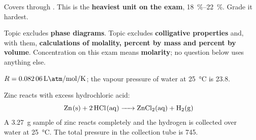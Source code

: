 \documentclass{apchem-exam}
\begin{document}
\apctitleblock

\begin{apcnote}
Covers  through . This is the \textbf{heaviest unit on
the exam}, \SI{18}{\percent}--\SI{22}{\percent}. Grade it hardest.

Topic  excludes \textbf{phase diagrams}. Topic  excludes
\textbf{colligative properties} and, with them, \textbf{calculations of
molality, percent by mass and percent by volume}. Concentration on this
exam means \textbf{molarity}; no question below uses anything else.

$R = \SI{0.08206}{\litre\atm\per\mole\per\kelvin}$; the vapour pressure of
water at \SI{25}{\celsius} is \SI{23.8}{\torr}.
\end{apcnote}



Zinc reacts with excess hydrochloric acid:
\[ \ce{Zn(s) + 2HCl(aq) -> ZnCl2(aq) + H2(g)} \]
A \SI{3.27}{\gram} sample of zinc reacts completely and the hydrogen is
collected over water at \SI{25}{\celsius}. The total pressure in the
collection tube is \SI{745}{\torr}.
\end{document}
